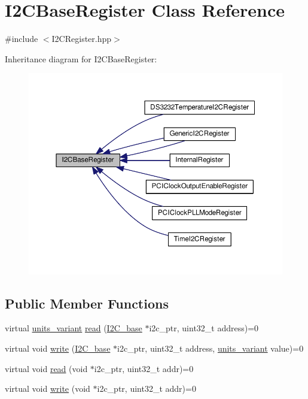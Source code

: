 \hypertarget{class_i2_c_base_register}{}\section{I2\+C\+Base\+Register Class Reference}
\label{class_i2_c_base_register}


{\ttfamily \#include $<$I2\+C\+Register.\+hpp$>$}



Inheritance diagram for I2\+C\+Base\+Register\+:\nopagebreak
\begin{figure}[H]
\begin{center}
\leavevmode
\includegraphics[width=350pt]{class_i2_c_base_register__inherit__graph}
\end{center}
\end{figure}
\subsection*{Public Member Functions}
\begin{DoxyCompactItemize}
\item 
virtual \hyperlink{units__define_8hpp_a95d46867fa79633565c288a0b4bd5408}{units\+\_\+variant} \hyperlink{class_i2_c_base_register_a947d834a745d3036c4cd8a2d5e19cd0d}{read} (\hyperlink{class_i2_c__base}{I2\+C\+\_\+base} $\ast$i2c\+\_\+ptr, uint32\+\_\+t address)=0
\item 
virtual void \hyperlink{class_i2_c_base_register_ad3f9f1404fe6af3e10e8f204b16d2066}{write} (\hyperlink{class_i2_c__base}{I2\+C\+\_\+base} $\ast$i2c\+\_\+ptr, uint32\+\_\+t address, \hyperlink{units__define_8hpp_a95d46867fa79633565c288a0b4bd5408}{units\+\_\+variant} value)=0
\item 
virtual void \hyperlink{class_i2_c_base_register_af1f72d5762a6141699b6af08333c4fda}{read} (void $\ast$i2c\+\_\+ptr, uint32\+\_\+t addr)=0
\item 
virtual void \hyperlink{class_i2_c_base_register_aed4dc86915a116908c4b5d7e8ffbde17}{write} (void $\ast$i2c\+\_\+ptr, uint32\+\_\+t addr)=0
\end{DoxyCompactItemize}
